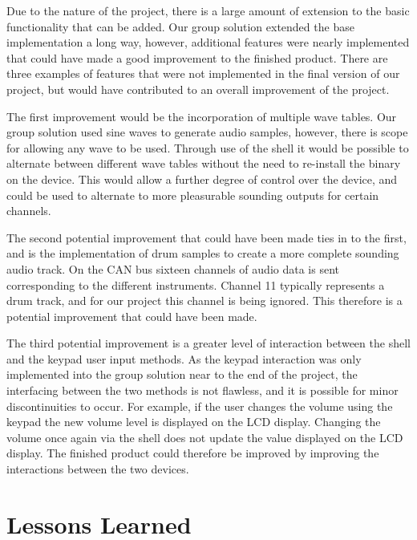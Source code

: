 Due to the nature of the project, there is a large amount of extension to the 
basic functionality that can be added. Our group solution extended the base 
implementation a long way, however, additional features were nearly implemented
that could have made a good improvement to the finished product. 
There are three examples of features that were not implemented in the final 
version of our project, but would have contributed to an overall improvement of 
the project. 
\par\bigskip\noindent
The first improvement would be the incorporation of multiple wave 
tables. 
Our group solution used sine waves to generate audio samples, however, 
there is scope for allowing any wave to be used. 
Through use of the shell it would be possible to alternate between different 
wave tables without the need to re-install the binary on the device. This would 
allow a further degree of control over the device, and could be used to alternate
to more pleasurable sounding outputs for certain channels. 
\par\bigskip\noindent
The second potential improvement that could have been made ties in to the first, 
and is the implementation of drum samples to create a more complete sounding 
audio track. On the CAN bus sixteen channels of audio data is sent corresponding 
to the different instruments. Channel 11 typically represents a drum track, and 
for our project this channel is being ignored. This therefore is a potential
improvement that could have been made. 
\par\bigskip\noindent
The third potential improvement is a greater level of interaction between the 
shell and the keypad user input methods. As the keypad interaction was only 
implemented into the group solution near to the end of the project, the interfacing 
between the two methods is not flawless, and it is possible for minor 
discontinuities to occur. For example, if the user changes the volume using the 
keypad the new volume level is displayed on the LCD display. Changing the 
volume once again via the shell does not update the value displayed on the LCD 
display. The finished product could therefore be improved by improving the 
interactions between the two devices. 

\section{Lessons Learned}

